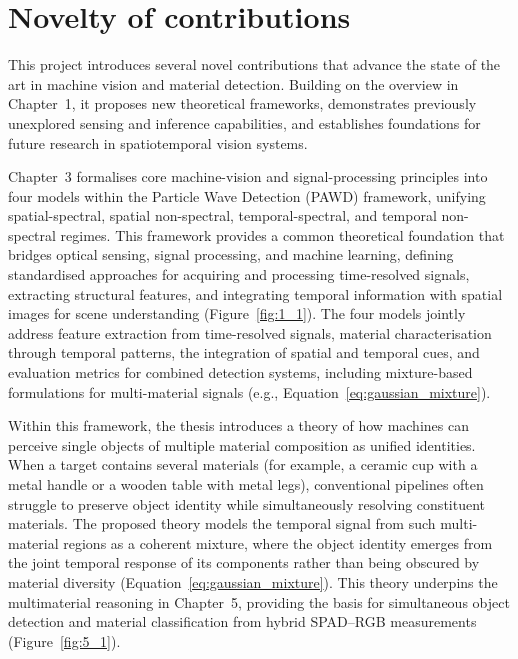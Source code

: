\documentclass[12pt,a4paper,oneside]{report}
\let\oldsection\section
\renewcommand{\section}{\clearpage\oldsection}
\begin{document}
\section{Novelty of contributions}
\label{sec:novelty_of_contributions_chapter7}

This project introduces several novel contributions that advance the state of the art in machine vision and material detection. Building on the overview in Chapter~1, it proposes new theoretical frameworks, demonstrates previously unexplored sensing and inference capabilities, and establishes foundations for future research in spatiotemporal vision systems.

Chapter~3 formalises core machine-vision and signal-processing principles into four models within the Particle Wave Detection (PAWD) framework, unifying spatial-spectral, spatial non-spectral, temporal-spectral, and temporal non-spectral regimes. This framework provides a common theoretical foundation that bridges optical sensing, signal processing, and machine learning, defining standardised approaches for acquiring and processing time-resolved signals, extracting structural features, and integrating temporal information with spatial images for scene understanding (Figure~\ref{fig:1_1}). The four models jointly address feature extraction from time-resolved signals, material characterisation through temporal patterns, the integration of spatial and temporal cues, and evaluation metrics for combined detection systems, including mixture-based formulations for multi-material signals (e.g., Equation~\ref{eq:gaussian_mixture}).

Within this framework, the thesis introduces a theory of how machines can perceive single objects of multiple material composition as unified identities. When a target contains several materials (for example, a ceramic cup with a metal handle or a wooden table with metal legs), conventional pipelines often struggle to preserve object identity while simultaneously resolving constituent materials. The proposed theory models the temporal signal from such multi-material regions as a coherent mixture, where the object identity emerges from the joint temporal response of its components rather than being obscured by material diversity (Equation~\ref{eq:gaussian_mixture}). This theory underpins the multimaterial reasoning in Chapter~5, providing the basis for simultaneous object detection and material classification from hybrid SPAD--RGB measurements (Figure~\ref{fig:5_1}).
\end{document}
